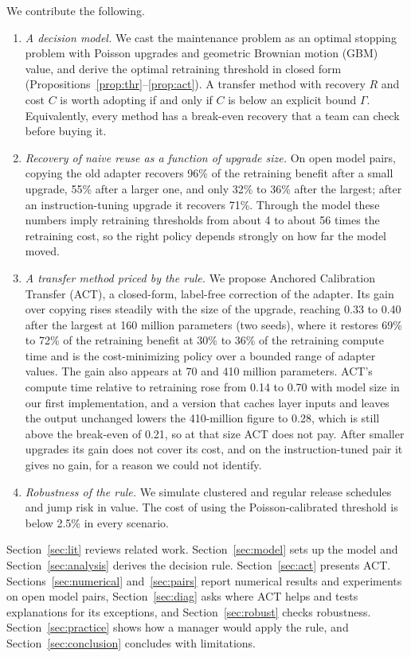 \documentclass[acmsmall,review]{acmart}
\begin{document}
We contribute the following.
\begin{enumerate}
\item \emph{A decision model.} We cast the maintenance problem as an optimal stopping problem with Poisson upgrades and geometric
Brownian motion (GBM) value, and derive the optimal retraining threshold in closed form (Propositions~\ref{prop:thr}--\ref{prop:act}).
A transfer method with recovery $R$ and cost $C$ is worth adopting if and only if $C$ is below an explicit bound $\Gamma$. Equivalently, every method has a
break-even recovery that a team can check before buying it.
\item \emph{Recovery of naive reuse as a function of upgrade size.} On open model pairs, copying the old adapter recovers 96\% of the retraining
benefit after a small upgrade, 55\% after a larger one, and only 32\% to 36\% after the largest; after an instruction-tuning upgrade it recovers 71\%. Through the model these numbers imply
retraining thresholds from about 4 to about 56 times the retraining cost, so the right policy depends strongly on how far the model moved.
\item \emph{A transfer method priced by the rule.} We propose Anchored Calibration Transfer (ACT), a closed-form, label-free correction of the adapter.
Its gain over copying rises steadily with the size of the upgrade, reaching 0.33 to 0.40 after the largest at 160 million parameters (two seeds), where it restores 69\% to 72\% of the retraining benefit at 30\% to 36\% of the retraining compute time and is the
cost-minimizing policy over a bounded range of adapter values. The gain also appears at 70 and 410 million parameters. ACT's compute time relative to retraining rose from 0.14 to 0.70 with model size in our first implementation, and a version that caches layer inputs and leaves the output unchanged lowers the 410-million figure to 0.28, which is still above the break-even of 0.21, so at that size ACT does not pay.
After smaller upgrades its gain does not cover its cost, and on the instruction-tuned pair it gives no gain, for a reason we could not identify.
\item \emph{Robustness of the rule.} We simulate clustered and regular release schedules and jump risk in value. The cost of using the
Poisson-calibrated threshold is below 2.5\% in every scenario.
\end{enumerate}

Section~\ref{sec:lit} reviews related work. Section~\ref{sec:model} sets up the model and Section~\ref{sec:analysis} derives the
decision rule. Section~\ref{sec:act} presents ACT. Sections~\ref{sec:numerical} and~\ref{sec:pairs} report numerical results and experiments on open
model pairs, Section~\ref{sec:diag} asks where ACT helps and tests explanations for its exceptions, and Section~\ref{sec:robust} checks robustness.
Section~\ref{sec:practice} shows how a manager would apply the rule, and Section~\ref{sec:conclusion} concludes with limitations.
\end{document}
